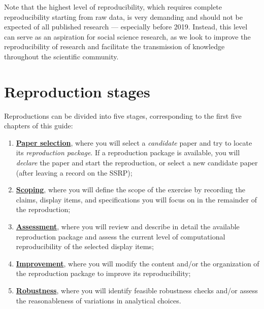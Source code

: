\documentclass[
]{book}
\providecommand{\tightlist}{%
  \setlength{\itemsep}{0pt}\setlength{\parskip}{0pt}}
\begin{document}
Note that the highest level of reproducibility, which requires complete reproducibility starting from raw data, is very demanding and should not be expected of all published research --- especially before 2019. Instead, this level can serve as an aspiration for social science research, as we look to improve the reproducibility of research and facilitate the transmission of knowledge throughout the scientific community.

\hypertarget{reproduction-stages}{%
\section*{Reproduction stages}\label{reproduction-stages}}

Reproductions can be divided into five stages, corresponding to the first five chapters of this guide:

\begin{enumerate}
\def\labelenumi{\arabic{enumi}.}
\setcounter{enumi}{-1}
\tightlist
\item
  \protect\hyperlink{select}{\textbf{Paper selection}}, where you will select a \emph{candidate} paper and try to locate its \emph{reproduction package}. If a reproduction package is available, you will \emph{declare} the paper and start the reproduction, or select a new candidate paper (after leaving a record on the SSRP);\\
\item
  \protect\hyperlink{scoping}{\textbf{Scoping}}, where you will define the scope of the exercise by recording the claims, display items, and specifications you will focus on in the remainder of the reproduction;\\
\item
  \protect\hyperlink{assessment}{\textbf{Assessment}}, where you will review and describe in detail the available reproduction package and assess the current level of computational reproducibility of the selected display items;
\item
  \protect\hyperlink{improvements}{\textbf{Improvement}}, where you will modify the content and/or the organization of the reproduction package to improve its reproducibility;\\
\item
  \protect\hyperlink{robust}{\textbf{Robustness}}, where you will identify feasible robustness checks and/or assess the reasonableness of variations in analytical choices.
\end{enumerate}
\end{document}
